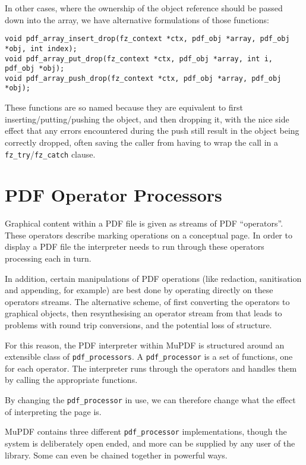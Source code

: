 \documentclass[oneside]{book}
\begin{document}
In other cases, where the ownership of the object reference should be passed down into the array, we have alternative formulations of those functions:

\begin{lstlisting}
void pdf_array_insert_drop(fz_context *ctx, pdf_obj *array, pdf_obj *obj, int index);
void pdf_array_put_drop(fz_context *ctx, pdf_obj *array, int i, pdf_obj *obj);
void pdf_array_push_drop(fz_context *ctx, pdf_obj *array, pdf_obj *obj);
\end{lstlisting}

These functions are so named because they are equivalent to first inserting/putting/pushing the object, and then dropping it, with the nice side effect that any errors encountered during the push still result in the object being correctly dropped, often saving the caller from having to wrap the call in a \texttt{fz\_try}/\texttt{fz\_catch} clause.

\section{PDF Operator Processors}

Graphical content within a PDF file is given as streams of PDF ``operators''. These operators describe marking operations on a conceptual page. In order to display a PDF file the interpreter needs to run through these operators processing each in turn.

In addition, certain manipulations of PDF operations (like redaction, sanitisation and appending, for example) are best done by operating directly on these operators streams. The alternative scheme, of first converting the operators to graphical objects, then resynthesising an operator stream from that leads to problems with round trip conversions, and the potential loss of structure.

For this reason, the PDF interpreter within MuPDF is structured around an extensible class of \texttt{pdf\_processors}. A \texttt{pdf\_processor} is a set of functions, one for each operator. The interpreter runs through the operators and handles them by calling the appropriate functions.

By changing the \texttt{pdf\_processor} in use, we can therefore change what the effect of interpreting the page is.

MuPDF contains three different \texttt{pdf\_processor} implementations, though the system is deliberately open ended, and more can be supplied by any user of the library. Some can even be chained together in powerful ways.
\end{document}
